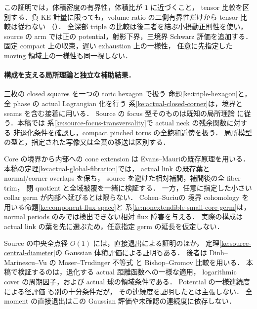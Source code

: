 この証明では，体積密度の有界性，体積比が $1$ に近づくこと，
tensor 比較を区別する．負 KE 計量に限っても，volume ratio の二側有界性だけから
tensor 比較は従わない
（\cite[\texttt{coarse:prop:density-counterexample}]{KELocalCurrent}）．
全深部 triple の比較は後二者を結ぶ小摂動正則性を使い，
source の arm では正の potential，射影下界，三境界 Schwarz 評価を追加する．
固定 compact 上の収束，遅い exhaustion 上の一様性，
任意に先指定した moving 領域上の一様性も同一視しない．

\paragraph{構成を支える局所理論と独立な補助結果．}
三枚の closed squares を一つの toric hexagon で扱う
命題\ref{ke:triple-hexagon}と，全 phase の actual Lagrangian 化を行う
系\ref{ke:actual-closed-corner}は，境界と seams を含む接着に用いる．
Source の focus 型そのものは既知の局所理論
\cite[\S\S2--4]{ZungFocus}に従う．本稿では
系\ref{ke:source-focus-transversality}で actual neck の残余関数に対する
非退化条件を確認し，compact pinched torus の全飽和近傍を扱う．
局所模型の型と，指定された写像又は全葉の移送は区別する．

Core の境界から内部への cone extension は
Evans--Mauri\cite[Lemma~2.16]{EM}の既存原理を用いる．
本稿の定理\ref{ke:actual-global-fibration}では，
actual link の既存葉と normal/corner overlaps を保ち，
source を避けた相対補間，補間後の全 fiber trim，
閉 quotient と全域被覆を一緒に検証する．
一方，任意に指定した小さい collar germ が内部へ延びるとは限らない．
Cohen--Suciu\cite[Proposition~2.5 and \S6.9]{CohenSuciuBoundary}の
境界 cohomology を用いる命題\ref{ke:component-flux-space}と
系\ref{ke:nonextendible-small-core-germ}は，
normal periods のみでは検出できない相対 flux 障害を与える．
実際の構成は actual link の葉を先に選ぶため，任意指定 germ の延長を仮定しない．

Source の中央全点径 $O(1)$ には，直接退出による証明のほか，
定理\ref{ke:source-central-diameter}の Gaussian 体積評価による証明もある．
後者は Dinh--Marinescu--Vu の Moser--Trudinger 不等式
\cite[Theorem~1.2]{DMVMT}と Bishop--Gromov 比較を用いる．
本稿で検証するのは，退化する actual 距離函数への一様な適用，
logarithmic cover の周期因子，および actual 球の領域条件である．
Potential の一様連続度による径評価
\cite[Proposition~1.4]{GGZDiameter}も別の十分条件だが，
その連続度を証明したとは主張しない．
全 moment の直接退出はこの Gaussian 評価や未確認の連続度に依存しない．


